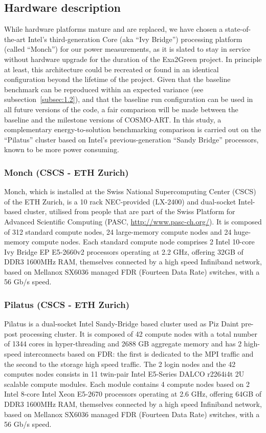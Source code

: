 \subsection{Hardware description}
\label{subsec:2.1}
While hardware  platforms mature  and are replaced,  we have  chosen a
state-of-the-art  Intel's third-generation  Core (aka  ``Ivy Bridge'')
processing platform (called ``Monch'')  for our power measurements, as
it  is slated  to stay  in service  without hardware  upgrade  for the
duration  of  the Exa2Green  project.   In  principle  at least,  this
architecture could be recreated or found in an identical configuration
beyond the lifetime of the project.  Given that the baseline benchmark
can    be    reproduced    within    an   expected    variance    (see
subsection~\ref{subsec:1.2}), and that  the baseline run configuration
can be used in all future versions of the code, a fair comparison will
be made between the baseline  and the milestone versions of COSMO-ART.
In  this   study,  a  complementary   energy-to-solution  benchmarking
comparison is carried out on  the ``Pilatus'' cluster based on Intel's
previous-generation  ``Sandy  Bridge'' processors,  known  to be  more
power consuming.

\subsubsection{Monch (CSCS - ETH Zurich)}
Monch, which is installed  at the Swiss National Supercomputing Center
(CSCS)  of the ETH  Zurich, is  a 10  rack NEC-provided  (LX-2400) and
dual-socket Intel-based cluster, utilised from people that are part of
the   Swiss  Platform   for  Advanced   Scientific   Computing  (PASC,
\url{http://www.pasc-ch.org/}).   It  is   composed  of  312  standard
compute  nodes,  24  large-memory  compute nodes  and  24  huge-memory
compute nodes.   Each standard compute node comprises  2 Intel 10-core
Ivy Bridge EP E5-2660v2 processors operating at 2.2 GHz, offering 32GB
of DDR3 1600MHz  RAM, themselves connected by a  high speed Infiniband
network,  based on Mellanox  SX6036 managed  FDR (Fourteen  Data Rate)
switches, with a 56 Gb/s speed.

\subsubsection{Pilatus (CSCS - ETH Zurich)}
Pilatus is a dual-socket Intel  Sandy-Bridge based cluster used as Piz
Daint pre-post processing cluster.  It is composed of 42 compute nodes
with  a total  number of  1344 cores  in hyper-threading  and  2688 GB
aggregate memory and has 2  high-speed interconnects based on FDR: the
first is  dedicated to the MPI  traffic and the second  to the storage
high  speed traffic.  The  2 login  nodes  and the  42 computes  nodes
consists in  11 twin-pair Intel  E5-Series DALCO r2264i4t  2U scalable
compute  modules.  Each  module contains  4 compute  nodes based  on 2
Intel  8-core Intel  Xeon  E5-2670 processors  operating  at 2.6  GHz,
offering  64GB of  DDR3 1600MHz  RAM, themselves  connected by  a high
speed  Infiniband  network,  based  on  Mellanox  SX6036  managed  FDR
(Fourteen Data Rate) switches, with a 56 Gb/s speed.

